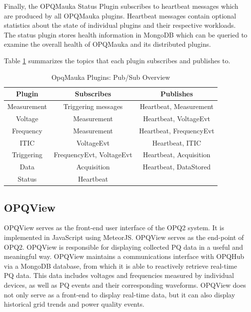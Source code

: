 \documentclass[a4paper, conference]{IEEEtran}
\begin{document}
Finally, the OPQMauka Status Plugin subscribes to heartbeat messages which are produced by all OPQMauka plugins. Heartbeat messages contain optional statistics about the state of individual plugins and their respective workloads. The status plugin stores health information in MongoDB which can be queried to examine the overall health of OPQMauka and its distributed plugins.

Table \ref{table:opqmauka} summarizes the topics that each plugin subscribes and publishes to.

\begin{table}
	\begin{tabular}{|c|c|c|}
		\hline 
		Plugin & Subscribes & Publishes \\ 
		\hline 
		Measurement  & Triggering messages & Heartbeat, Measurement \\ 
		\hline 
		Voltage & Measurement & Heartbeat, VoltageEvt \\ 
		\hline 
		Frequency  & Measurement & Heartbeat, FrequencyEvt \\ 
		\hline 
		ITIC &  VoltageEvt & Heartbeat, ITIC \\ 
		\hline 
		Triggering & FrequencyEvt, VoltageEvt & Heartbeat, Acquisition \\ 
		\hline 
		Data &  Acquisition & Heartbeat, DataStored \\ 
		\hline 
		Status & Heartbeat &  \\ 
		\hline 
	\end{tabular}
	\caption{OpqMauka Plugins: Pub/Sub Overview}
	\label{table:opqmauka}
\end{table}
 
\subsection{OPQView}
OPQView serves as the front-end user interface of the OPQ2 system. It is implemented in JavaScript using MeteorJS. OPQView serves as the end-point of OPQ2. OPQView is responsible for displaying collected PQ data in a useful and meaningful way. OPQView maintains a communications interface with OPQHub via a MongoDB database, from which it is able to reactively retrieve real-time PQ data. This data includes voltages and frequencies measured by individual devices, as well as PQ events and their corresponding waveforms.  OPQView does not only serve as a front-end to display real-time data, but it can also display historical grid trends and power quality events. 
\end{document}
